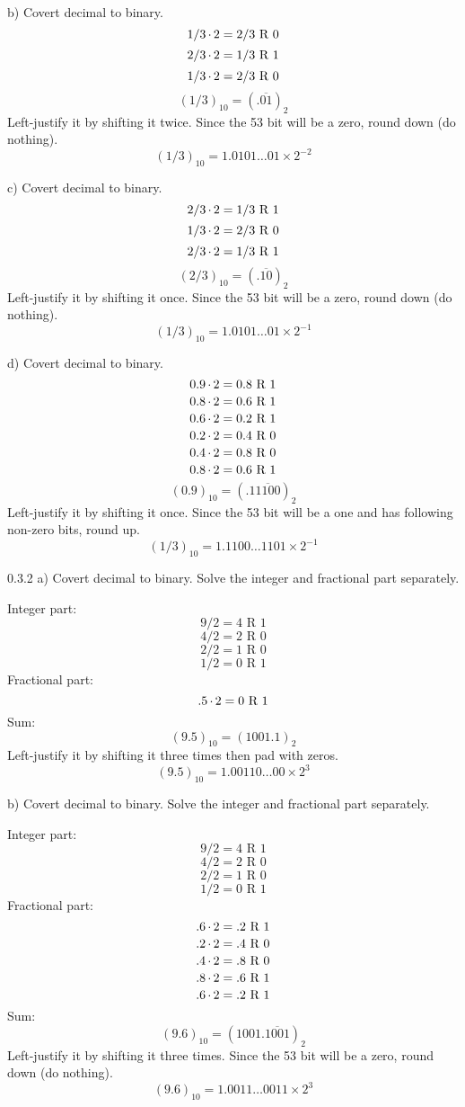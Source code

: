 \begin{task}{b)}
Covert decimal to binary.
\[1/3\operatorname{\cdot}2=2/3\text{ R }0\]
\[2/3\operatorname{\cdot}2=1/3\text{ R }1\]
\[1/3\operatorname{\cdot}2=2/3\text{ R }0\]
\[(1/3)_{10}=(.\overline{01})_2\]
Left-justify it by shifting it twice. Since the 53 bit will be a zero, round down (do nothing).
\[(1/3)_{10}=1.0101\ldots01 \times 2^{-2}\]
\end{task}

\begin{task}{c)}
Covert decimal to binary.
\[2/3\operatorname{\cdot}2=1/3\text{ R }1\]
\[1/3\operatorname{\cdot}2=2/3\text{ R }0\]
\[2/3\operatorname{\cdot}2=1/3\text{ R }1\]
\[(2/3)_{10}=(.\overline{10})_2\]
Left-justify it by shifting it once. Since the 53 bit will be a zero, round down (do nothing).
\[(1/3)_{10}=1.0101\ldots01 \times 2^{-1}\]
\end{task}

\begin{task}{d)}
Covert decimal to binary.
\[0.9\operatorname{\cdot}2=0.8\text{ R }1\]
\[0.8\operatorname{\cdot}2=0.6\text{ R }1\]
\[0.6\operatorname{\cdot}2=0.2\text{ R }1\]
\[0.2\operatorname{\cdot}2=0.4\text{ R }0\]
\[0.4\operatorname{\cdot}2=0.8\text{ R }0\]
\[0.8\operatorname{\cdot}2=0.6\text{ R }1\]
\[(0.9)_{10}=(.1\overline{1100})_2\]
Left-justify it by shifting it once. Since the 53 bit will be a one and has following non-zero bits, round up.
\[(1/3)_{10}=1.1100\ldots1101 \times 2^{-1}\]
\end{task}

\begin{task}{0.3.2 a)}
Covert decimal to binary. Solve the integer and fractional part separately.

Integer part:
\[9/2=4\text{ R }1\]
\[4/2=2\text{ R }0\]
\[2/2=1\text{ R }0\]
\[1/2=0\text{ R }1\]
Fractional part:
\[.5\operatorname{\cdot}2=0\text{ R }1\]
Sum:
\[(9.5)_{10}=(1001.1)_2\]
Left-justify it by shifting it three times then pad with zeros.
\[(9.5)_{10}=1.00110\ldots00 \times 2^{3}\]
\end{task}

\begin{task}{b)}
Covert decimal to binary. Solve the integer and fractional part separately.

Integer part:
\[9/2=4\text{ R }1\]
\[4/2=2\text{ R }0\]
\[2/2=1\text{ R }0\]
\[1/2=0\text{ R }1\]
Fractional part:
\[.6\operatorname{\cdot}2=.2\text{ R }1\]
\[.2\operatorname{\cdot}2=.4\text{ R }0\]
\[.4\operatorname{\cdot}2=.8\text{ R }0\]
\[.8\operatorname{\cdot}2=.6\text{ R }1\]
\[.6\operatorname{\cdot}2=.2\text{ R }1\]
Sum:
\[(9.6)_{10}=(1001.\overline{1001})_2\]
Left-justify it by shifting it three times. Since the 53 bit will be a zero, round down (do nothing).
\[(9.6)_{10}=1.0011\ldots0011 \times 2^{3}\]
\end{task}

